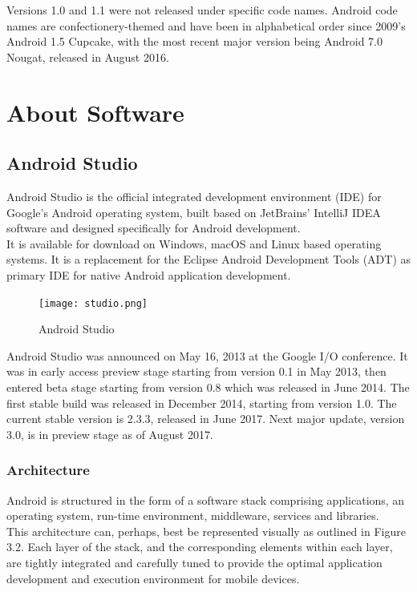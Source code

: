 \documentclass[twoside,a4paper,16pt]{book}
\begin{document}
 \vspace{0.2cm}
Versions 1.0 and 1.1 were not released under specific code names. Android code names are confectionery-themed and have been in alphabetical order since 2009's Android 1.5 Cupcake, with the most recent major version being Android 7.0 Nougat, released in August 2016.\\




\newpage
\chapter{\bf About Software}
\section{Android Studio}
Android Studio is the official integrated development environment (IDE) for Google's Android operating system, built based on JetBrains' IntelliJ IDEA software and designed specifically for Android development.\\ It is available for download on Windows, macOS and Linux based operating systems. It is a replacement for the Eclipse Android Development Tools (ADT) as primary IDE for native Android application development.\\
\vspace{0.6cm}

\begin{figure}[ht!]
\begin{center}
\texttt{[image: studio.png]}
\caption{Android Studio}
\end{center}
\end{figure}

 \vspace{0.2cm}
Android Studio was announced on May 16, 2013 at the Google I/O conference. It was in early access preview stage starting from version 0.1 in May 2013, then entered beta stage starting from version 0.8 which was released in June 2014. The first stable build was released in December 2014, starting from version 1.0. The current stable version is 2.3.3, released in June 2017. Next major update, version 3.0, is in preview stage as of August 2017.




\subsection{ Architecture}
Android is structured in the form of a software stack comprising applications, an operating system, run-time environment, middleware, services and libraries.\\ This architecture can, perhaps, best be represented visually as outlined in Figure 3.2. Each layer of the stack, and the corresponding elements within each layer, are tightly integrated and carefully tuned to provide the optimal application development and execution environment for mobile devices.
\vspace{0.6cm}
\end{document}
